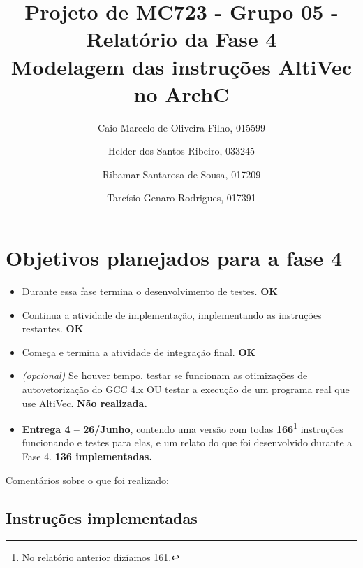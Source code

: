 \documentclass{article}
\begin{document}
\title{Projeto de MC723 - Grupo 05 - Relatório da Fase 4\\ Modelagem das instruções AltiVec no ArchC}
\author{
Caio Marcelo de Oliveira Filho, 015599 \and
Helder dos Santos Ribeiro, 033245 \and
Ribamar Santarosa de Sousa, 017209 \and 
Tarcísio Genaro Rodrigues, 017391
}

\date{}
\maketitle

\section{Objetivos planejados para a fase 4}

\begin{itemize}


\item Durante essa fase termina o desenvolvimento de testes. \textbf{OK}

\item Continua a atividade de implementação, implementando as instruções
restantes. \textbf{OK}

\item Começa e termina a atividade de integração final. \textbf{OK}

\item \emph{(opcional)} Se houver tempo, testar se funcionam as otimizações de
autovetorização do GCC 4.x OU testar a execução de um programa real que use
AltiVec. \textbf{Não realizada.}

\item \textbf{Entrega 4 -- 26/Junho}, contendo uma versão com todas
\textbf{166}\footnote{No relatório anterior dizíamos 161.} instruções funcionando e testes para elas, e um relato do que foi
desenvolvido durante a Fase 4. \textbf{136 implementadas.}

\end{itemize}

Comentários sobre o que foi realizado:

\subsection{Instruções implementadas}
\end{document}

